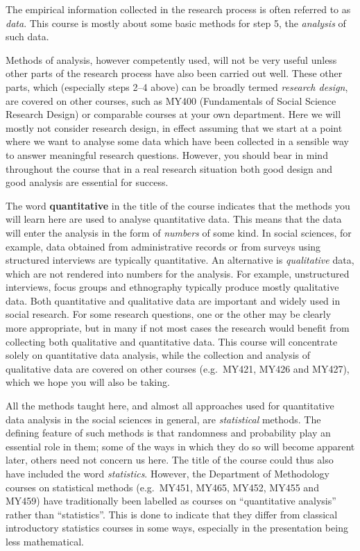 The empirical information collected in the research process is often
referred to as \emph{data}. This course is mostly about
some basic methods for step 5, the \emph{analysis} of such data.

Methods of analysis, however competently used, will not be very useful
unless other parts of the research process have also been carried out
well. These other parts, which (especially steps 2--4 above) can be
broadly termed \emph{research design}, are covered on other courses,
such as MY400 (Fundamentals of Social Science Research Design) or comparable
courses at your own department. Here we will mostly not consider
research design, in effect assuming that we start at a point where we
want to analyse some data which have been collected in a sensible
way to answer meaningful research questions. However, you should bear in
mind throughout the course that in a real research situation both good
design and good analysis are essential for success.

The word \textbf{quantitative} in the title of the course indicates that
the methods you will learn here are used to analyse quantitative data. This
means that the data will enter the analysis in the form of
\emph{numbers} of some kind. In social sciences, for example,
data obtained from administrative records or from surveys using
structured interviews are typically quantitative. An alternative is
\emph{qualitative} data, which are not rendered into numbers for the
analysis. For example, unstructured interviews, focus groups and
ethnography typically produce mostly qualitative data. Both quantitative
and qualitative data are important and widely used in social research.
For some research questions, one or the other may be clearly more
appropriate, but in many if not most cases the research would benefit
from collecting both qualitative and quantitative data. This course will
concentrate solely on quantitative data analysis, while the collection
and analysis of qualitative data are covered on other courses (e.g.\
MY421, MY426 and MY427), which we hope you will also be taking.

All the methods taught here, and almost all approaches used for
quantitative data analysis in the social sciences in general, are
\emph{statistical} methods. The defining feature of such methods is that
randomness and probability play an essential role in them; some of the
ways in which they do so will become apparent later, others need not
concern us here. The title of the course could thus also have included
the word \emph{statistics}. However, the Department of Methodology courses on
statistical methods (e.g.\ MY451, MY465, MY452, MY455 and MY459) have traditionally been
labelled as courses on ``quantitative analysis'' rather than
``statistics''. This is done to indicate that they differ from classical introductory
statistics courses in some ways, especially in the presentation being
less mathematical.

